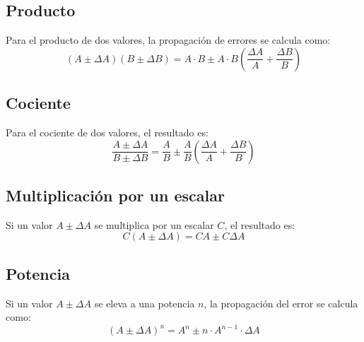 \subsection{Producto}
Para el producto de dos valores, la propagación de errores se calcula como:
\[
(A \pm \Delta A)(B \pm \Delta B) = A \cdot B \pm A \cdot B \left( \frac{\Delta A}{A} + \frac{\Delta B}{B} \right)
\]

\subsection{Cociente}
Para el cociente de dos valores, el resultado es:
\[
\frac{A \pm \Delta A}{B \pm \Delta B} = \frac{A}{B} \pm \frac{A}{B} \left( \frac{\Delta A}{A} + \frac{\Delta B}{B} \right)
\]

\subsection{Multiplicación por un escalar}
Si un valor $A \pm \Delta A$ se multiplica por un escalar $C$, el resultado es:
\[
C(A \pm \Delta A) = CA \pm C \Delta A
\]

\subsection{Potencia}
Si un valor $A \pm \Delta A$ se eleva a una potencia $n$, la propagación del error se calcula como:
\[
(A \pm \Delta A)^n = A^n \pm n \cdot A^{n-1} \cdot \Delta A
\]